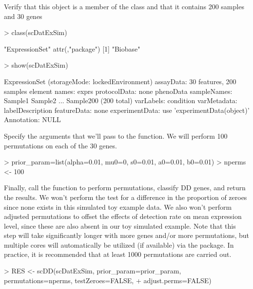 \documentclass{article}
\begin{document}
Verify that this object is a member of the  class and that it contains 200 samples and 30 genes
\begin{Schunk}
\begin{Sinput}
> class(scDatExSim)
\end{Sinput}
\begin{Soutput}
[1] "ExpressionSet"
attr(,"package")
[1] "Biobase"
\end{Soutput}
\begin{Sinput}
> show(scDatExSim)
\end{Sinput}
\begin{Soutput}
ExpressionSet (storageMode: lockedEnvironment)
assayData: 30 features, 200 samples 
  element names: exprs 
protocolData: none
phenoData
  sampleNames: Sample1 Sample2 ... Sample200 (200 total)
  varLabels: condition
  varMetadata: labelDescription
featureData: none
experimentData: use 'experimentData(object)'
Annotation:  
NULL
\end{Soutput}
\end{Schunk}

Specify the arguments that we'll pass to the  function.  We will perform 100 permutations on each of the 30 genes.
\begin{Schunk}
\begin{Sinput}
> prior_param=list(alpha=0.01, mu0=0, s0=0.01, a0=0.01, b0=0.01)
> nperms <- 100
\end{Sinput}
\end{Schunk}
 
Finally, call the  function to perform permutations, classify DD genes, and return the results.  We won't perform the test for a difference in the proportion of zeroes since none exists in this simulated toy example data.  We also won't perform adjusted permutations to offset the effects of detection rate on mean expression level, since these are also absent in our toy simulated example.  Note that this step will take significantly longer with more genes and/or more permutations, but multiple cores will automatically be utilized (if available) via the  package.  In practice, it is recommended that at least 1000 permutations are carried out.

\begin{Schunk}
\begin{Sinput}
> RES <- scDD(scDatExSim, prior_param=prior_param, permutations=nperms, testZeroes=FALSE,
+             adjust.perms=FALSE)
\end{Sinput}
\end{Schunk}
\end{document}
